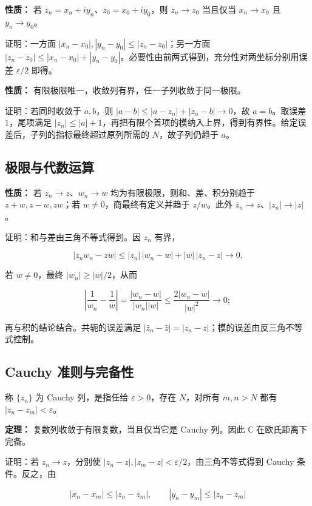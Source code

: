 \documentclass[11pt,a4paper]{article}
\begin{document}
\textbf{性质：} 若 \(z_n=x_n+iy_n\)、\(z_0=x_0+iy_0\)，则 \(z_n\to z_0\)
当且仅当 \(x_n\to x_0\) 且 \(y_n\to y_0\)。

证明：一方面 \(|x_n-x_0|,|y_n-y_0|\le|z_n-z_0|\)；另一方面
\(|z_n-z_0|\le|x_n-x_0|+|y_n-y_0|\)。必要性由前两式得到，充分性对两坐标分别用误差
\(\varepsilon/2\) 即得。

\textbf{性质：} 有限极限唯一，收敛列有界，任一子列收敛于同一极限。

证明：若同时收敛于 \(a,b\)，则 \(|a-b|\le|a-z_n|+|z_n-b|\to0\)，故
\(a=b\)。取误差 \(1\)，尾项满足
\(|z_n|\le|a|+1\)，再把有限个首项的模纳入上界，得到有界性。给定误差后，子列的指标最终超过原列所需的
\(N\)，故子列仍趋于 \(a\)。

\subsection{极限与代数运算}\label{ux6781ux9650ux4e0eux4ee3ux6570ux8fd0ux7b97}

\textbf{性质：} 若 \(z_n\to z\)、\(w_n\to w\)
均为有限极限，则和、差、积分别趋于 \(z+w,z-w,zw\)；若
\(w\ne0\)，商最终有定义并趋于 \(z/w\)。此外
\(\bar z_n\to\bar z\)、\(|z_n|\to|z|\)。

证明：和与差由三角不等式得到。因 \(z_n\) 有界，

\[
|z_nw_n-zw|\le |z_n|\,|w_n-w|+|w|\,|z_n-z|\longrightarrow0.
\]

若 \(w\ne0\)，最终 \(|w_n|\ge|w|/2\)，从而

\[
\left|\frac1{w_n}-\frac1w\right|
=\frac{|w_n-w|}{|w_n||w|}
\le\frac{2|w_n-w|}{|w|^2}\longrightarrow0;
\]

再与积的结论结合。共轭的误差满足
\(|\bar z_n-\bar z|=|z_n-z|\)；模的误差由反三角不等式控制。

\subsection{Cauchy
准则与完备性}\label{cauchy-ux51c6ux5219ux4e0eux5b8cux5907ux6027}

称 \(\{z_n\}\) 为 Cauchy 列，是指任给 \(\varepsilon>0\)，存在
\(N\)，对所有 \(m,n>N\) 都有 \(|z_n-z_m|<\varepsilon\)。

\textbf{定理：} 复数列收敛于有限复数，当且仅当它是 Cauchy 列。因此
\(\mathbb C\) 在欧氏距离下完备。

证明：若 \(z_n\to z\)，分别使
\(|z_n-z|,|z_m-z|<\varepsilon/2\)，由三角不等式得到 Cauchy
条件。反之，由

\[
|x_n-x_m|\le|z_n-z_m|,\qquad
|y_n-y_m|\le|z_n-z_m|
\]
\end{document}
